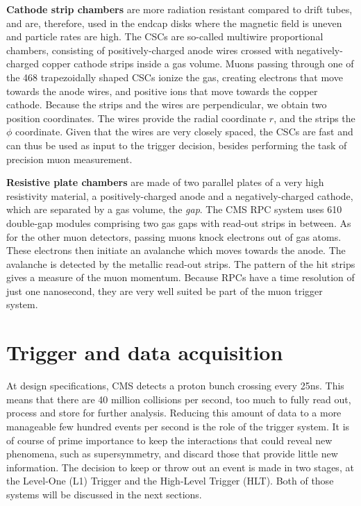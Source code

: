 \textbf{Cathode strip chambers} are more radiation resistant compared to drift tubes, and are,
therefore, used in the endcap disks where the magnetic field is uneven and particle rates are high. 
The CSCs are so-called multiwire proportional chambers, consisting of positively-charged anode wires
crossed with negatively-charged copper cathode strips inside a gas volume. Muons passing through
one of the 468 trapezoidally shaped CSCs ionize the gas, creating electrons that move
towards the anode wires, and positive ions that move towards the copper cathode. 
Because the strips and the wires are perpendicular, we obtain two position coordinates. The
wires provide the radial coordinate $r$, and the strips the $\phi$ coordinate. 
Given that the wires are very closely spaced, the CSCs are fast and can thus be used as input to the
trigger decision, besides performing the task of precision muon measurement. 

\textbf{Resistive plate chambers} are made of two parallel plates of a very high resistivity
material, a positively-charged anode and a negatively-charged cathode, which are separated by a gas
volume, the \textit{gap}. The CMS RPC system uses 610 double-gap modules comprising two gas gaps
with read-out strips in between. 
As for the other muon detectors, passing muons knock electrons out of gas atoms. These electrons
then initiate an avalanche which moves towards the anode. The avalanche is detected by the metallic
read-out strips. The pattern of the hit strips gives a measure of the muon momentum. Because RPCs
have a time resolution of just one nanosecond, they are very well suited be part of the muon trigger
system. 



\section{Trigger and data acquisition \label{sec:cms_tdaq}}

At design specifications, CMS detects a proton bunch crossing every 25\unit{ns}. This means that
there are 40 million collisions per second, too much to fully read out, process and store for
further analysis. Reducing this amount of data to a more manageable few hundred events
per second is the role of the trigger system. It is of course of prime importance to keep the
interactions that could reveal new phenomena, such as supersymmetry, and discard those that provide
little new information. 
The decision to keep or throw out an event is made in two stages, at the Level-One (L1) Trigger and
the High-Level Trigger (HLT). Both of those systems will be discussed in the next sections. 

